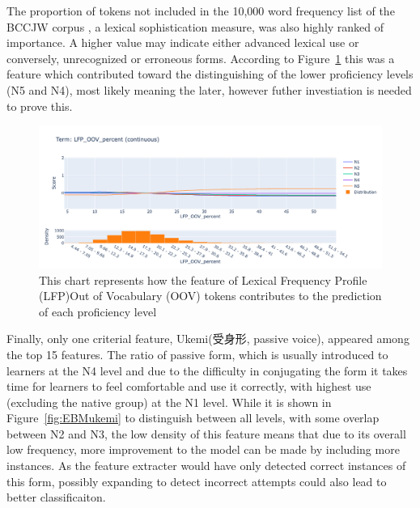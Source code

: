 The proportion of tokens not included in the 10,000 word frequency list of the BCCJW corpus , a lexical
sophistication measure, was also highly ranked of importance. A higher value may indicate either advanced lexical
use or conversely, unrecognized or erroneous forms. According to Figure~\ref{fig:EBMlfpOOV} this was a feature which
contributed toward the distinguishing of the lower proficiency levels (N5 and N4), most likely meaning the later,
however futher investiation is needed to prove this.

\begin{figure}[h!]
    \centering
    \includegraphics[scale=.4]{img/EBM/EBMlfpOOV}
    \caption[Contribution of Percentage of Lexical Frequency Profile (LFP)Out of Vocabulary (OOV) tokens]{This chart represents how the feature of Lexical Frequency Profile (LFP)Out of Vocabulary (OOV) tokens contributes to the prediction of each proficiency level}
    \label{fig:EBMlfpOOV}
\end{figure}


Finally, only one criterial feature, Ukemi(受身形, passive voice), appeared among the top 15 features.  The ratio of
passive form, which is usually introduced to learners at the N4 level and due to the difficulty in conjugating the
form it takes time for learners to feel comfortable and use it correctly, with highest use (excluding the
native group) at the N1 level.  While it is shown in Figure~\ref{fig:EBMukemi} to distinguish between all levels,
with some overlap between N2 and N3, the low density of this feature means that due to its overall low frequency,
more improvement to the model can be made by including more instances. As the feature extracter would have only
detected correct instances of this form, possibly expanding to detect incorrect attempts could also lead to better
classificaiton.

